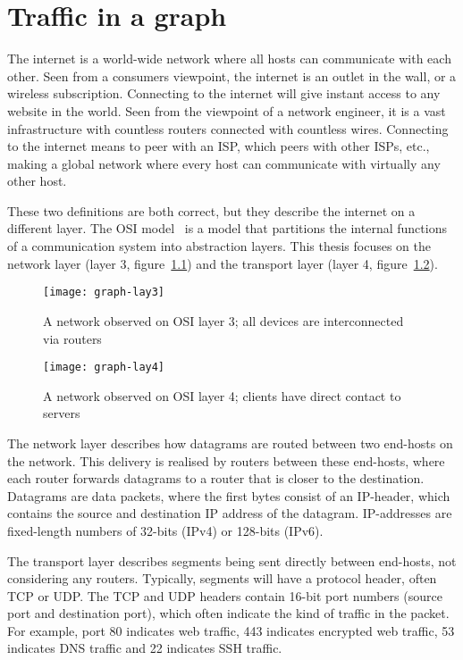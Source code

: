 \chapter{Traffic in a graph}
\label{chp:traffic}

The internet is a world-wide network where all hosts can communicate with each other.
Seen from a consumers viewpoint, the internet is an outlet in the wall, or a wireless subscription.
Connecting to the internet will give instant access to any website in the world.
Seen from the viewpoint of a network engineer, it is a vast infrastructure with countless routers connected with countless wires.
Connecting to the internet means to peer with an ISP, which peers with other ISPs, etc.,
 making a global network where every host can communicate with virtually any other host.

These two definitions are both correct, but they describe the internet on a different layer.
The OSI model~\cite{zimmermann1980osi} is a model that partitions the internal functions of a communication system into abstraction layers.
This thesis focuses on the network layer (layer 3, figure~\ref{fig:graph-lay3}) and the transport layer (layer 4, figure~\ref{fig:graph-lay4}).

\begin{figure}[h!]
	\caption{A network observed on OSI layer 3; all devices are interconnected via routers}
	\label{fig:graph-lay3}
	\centering
		\texttt{[image: graph-lay3]}
\end{figure}

\begin{figure}[h!]
	\caption{A network observed on OSI layer 4; clients have direct contact to servers}
	\label{fig:graph-lay4}
	\centering
		\texttt{[image: graph-lay4]}
\end{figure}

The network layer describes how datagrams are routed between two end-hosts on the network.
This delivery is realised by routers between these end-hosts,
 where each router forwards datagrams to a router that is closer to the destination.
Datagrams are data packets, where the first bytes consist of an IP-header,
 which contains the source and destination IP address of the datagram.
IP-addresses are fixed-length numbers of 32-bits (IPv4) or 128-bits (IPv6).

The transport layer describes segments being sent directly between end-hosts,
 not considering any routers.
Typically, segments will have a protocol header, often TCP or UDP.
The TCP and UDP headers contain 16-bit port numbers (source port and destination port),
which often indicate the kind of traffic in the packet.
For example,
 port 80 indicates web traffic,
 443 indicates encrypted web traffic,
 53 indicates DNS traffic and 22 indicates SSH traffic.


